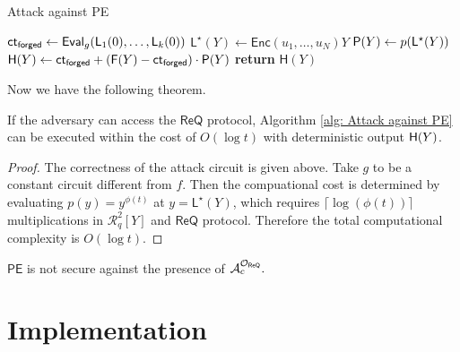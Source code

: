 \documentclass[runningheads]{llncs}
\newcommand{\cc}[1]{\mathcal{#1}} %
\newcommand{\ct}{\textsf{ct}{}}
\newcommand{\eval}{\textsf{Eval}}
\newcommand{\PE}{\textsf{PE}{}}
\newcommand{\REQ}{\textsf{ReQ}}
\newcommand{\enc}{\textsf{Enc}}
\begin{document}
        \begin{algorithm}
            \caption{Attack against \PE}
            \label{alg: Attack against PE}
            \begin{algorithmic}[1]
                 
                    \State $\ct_{\sf forged}\gets \eval_g(\mathsf L_1(0),\dots, \mathsf L_k(0))$ 
                    \State $\mathsf L^\star(Y)\gets\enc(u_1,\dots,u_N)Y$ 
                    \State $\mathsf P(Y)\gets p({\sf L}^\star (Y))$ 
                    \State $\mathsf H(Y)\gets \ct_{\sf forged}+(\mathsf{F}(Y)-\ct_{\sf forged})\cdot \mathsf{P}(Y)$
                    \State \textbf{return} $\mathsf H(Y)$
                \EndProcedure
            \end{algorithmic}
        \end{algorithm}
    
    Now we have the following theorem.
        \begin{theorem}
            If the adversary can access the $\REQ$ protocol, Algorithm \ref{alg: Attack against PE} can be executed within the cost of $O(\log t)$ with deterministic output ${\sf H}(Y)$.
        \end{theorem}
        \begin{proof}
            The correctness of the attack circuit is given above.
            Take $g$ to be a constant circuit different from $f$. Then the compuational cost is determined by evaluating $p(y)=y^{\phi(t)}$ at $y=\mathsf L^\star (Y)$, which requires $\lceil\log(\phi(t))\rceil$ multiplications in $\cc R^2_q[Y]$ and $\REQ$ protocol. Therefore the total computational complexity is $O(\log t)$.
        \end{proof}

        \begin{corollary}
            $\PE$ is not secure against the presence of $\cc A_c^{\cc O_{\sf ReQ}}.$
        \end{corollary}
        

\section{Implementation}\label{sec: Implementation}
\end{document}
